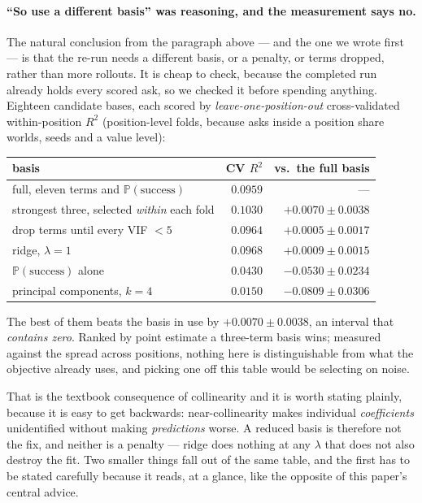 \documentclass[11pt,a4paper]{article}
\newcommand{\Prob}{\ensuremath{\mathbb{P}}}
\begin{document}
\paragraph{``So use a different basis'' was reasoning, and the measurement says
no.} The natural conclusion from the paragraph above --- and the one we wrote
first --- is that the re-run needs a different basis, or a penalty, or terms
dropped, rather than more rollouts. It is cheap to check, because the completed
run already holds every scored ask, so we checked it before spending anything.
Eighteen candidate bases, each scored by \emph{leave-one-position-out}
cross-validated within-position $R^2$ (position-level folds, because asks inside
a position share worlds, seeds and a value level):
\begin{center}
\begin{tabular}{lrr}
\toprule
basis & CV $R^2$ & vs.\ the full basis \\
\midrule
full, eleven terms and $\Prob(\text{success})$ & $0.0959$ & --- \\
strongest three, selected \emph{within} each fold & $\mathbf{0.1030}$ & $+0.0070 \pm 0.0038$ \\
drop terms until every VIF $< 5$ & $0.0964$ & $+0.0005 \pm 0.0017$ \\
ridge, $\lambda = 1$ & $0.0968$ & $+0.0009 \pm 0.0015$ \\
$\Prob(\text{success})$ alone & $0.0430$ & $-0.0530 \pm 0.0234$ \\
principal components, $k = 4$ & $0.0150$ & $-0.0809 \pm 0.0306$ \\
\bottomrule
\end{tabular}
\end{center}
The best of them beats the basis in use by $+0.0070 \pm 0.0038$, an interval
that \emph{contains zero}. Ranked by point estimate a three-term basis wins;
measured against the spread across positions, nothing here is distinguishable
from what the objective already uses, and picking one off this table would be
selecting on noise.

That is the textbook consequence of collinearity and it is worth stating
plainly, because it is easy to get backwards: near-collinearity makes individual
\emph{coefficients} unidentified without making \emph{predictions} worse. A
reduced basis is therefore not the fix, and neither is a penalty --- ridge does
nothing at any $\lambda$ that does not also destroy the fit. Two smaller things
fall out of the same table, and the first has to be stated carefully because it
reads, at a glance, like the opposite of this paper's central advice.
\end{document}
